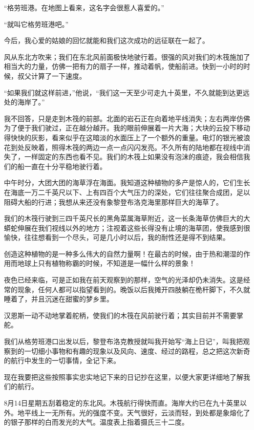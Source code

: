 \documentclass[10pt]{book}
\begin{document}
“格劳班港。在地图上看来，这名字会很惹人喜爱的。”

“就叫它格劳班港吧。”

今后，我心爱的姑娘的回忆就能和我们这次成功的远征联在一起了。

风从东北方吹来；我们在东北风前面极快地驶行着。很强的风对我们的木筏施加了相当大的力量，仿佛一把有力的扇子一样，推动着帆，使船前进。快到一小时的时候，叔父计算了一下速度。

“如果我们就这样前进，”他说，“我们这一天至少可走九十英里，不久就能到达更远处的海岸了。”

我不回答，只是走到木筏的前部。北面的岩石正在向着地平线消失；左右两岸仿佛为了便于我们驶过，正在越分越开。我的眼前伸展着一片大海；大块的云投下移动得快快的灰影，看来似乎在这暗淡的水面压上了一个额外的重量。电灯的银光被浪花到处反映着，照得木筏的两边一点一点闪闪发亮。不久所有的陆地都在视线中消失了，一样固定的东西也看不见。我们的木筏上如果没有泡沫的痕迹，我会相信我们的船一直在十分平稳地驶行着。

中午时分，大团大团的海草浮在海面。我知道这种植物的多产是惊人的，它们生长在海底一万二千英尺以下、上有四百个大气压力的深处，它们往往聚合成团，足以阻碍大船的行进；我想从来还没有象黎登布洛克海里那样巨大的海草了。

我们的木筏行驶到三四千英尺长的黑角菜属海草附近，这一长条海草仿佛巨大的大蟒蛇伸展在我们视线以外的地方；注视着这些长得没有止境的海草团，使我感到很愉快，往往想看到一个尽头，可是几小时以后，我的耐性还是得不到结果。

创造这种植物的是一种多么伟大的自然力量啊！在最古的时候，由于热和潮湿的作用而地球上只有植物称霸的时候，不知道是一幅什么样的景象！

夜色已经来临，可是正如我在前天观察到的那样，空气的光泽却仍未消失。这是经常的现象，任何人都可以指望看到的。晚饭以后我摊开四肢躺在桅杆脚下，不久就睡着了，并且沉迷在甜蜜的梦乡里。

汉恩斯一动不动地掌着舵柄，使我们的木筏在风前驶行着；其实目前并不需要掌舵。

我们从格劳班港口出发以后，黎登布洛克教授就叫我开始写“海上日记”，叫我把观察到的一切细小事物和有趣的现象以及风向、速度、经过的路程，总之把这次新奇的航行中发生的一切事情，全记下来。

现在我要把这些按照事实忠实地记下来的日记抄在这里，以便大家更详细地了解我们的航行。

8月14日星期五刮着稳定的东北风。木筏航行得快而直。海岸大约已在九十英里以外。地平线上一无所有。光的强度不变。天气很好，云淡而轻，到处都是象熔化了的银子那样的白而发光的大气。温度表上指着摄氏三十二度。
\end{document}
